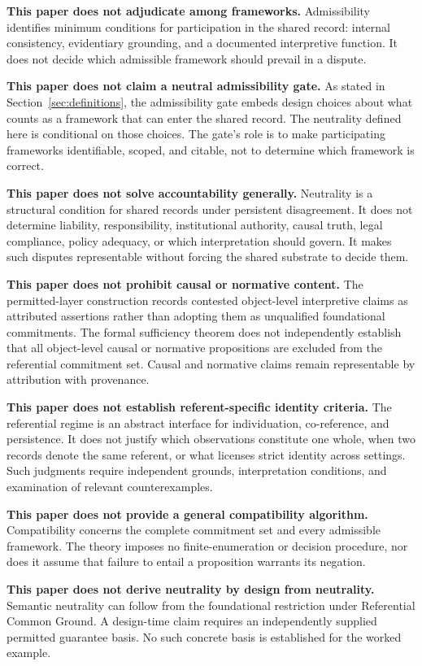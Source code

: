 \documentclass[11pt]{article}
\theoremstyle{plain}
\theoremstyle{definition}
\theoremstyle{remark}
\newcommand{\SecRef}[1]{Section~\ref{#1}}
\begin{document}
\textbf{This paper does not adjudicate among frameworks.}
Admissibility identifies minimum conditions for participation in the shared
record:
internal consistency,
evidentiary grounding,
and a documented interpretive function.
It does not decide which admissible framework should prevail in a dispute.

\textbf{This paper does not claim a neutral admissibility gate.}
As stated in \SecRef{sec:definitions},
the admissibility gate embeds design choices about what counts as
a framework that can enter the shared record.
The neutrality defined here is conditional on those choices.
The gate's role is to make participating frameworks identifiable,
scoped, and citable,
not to determine which framework is correct.

\textbf{This paper does not solve accountability generally.}
Neutrality is a structural condition for
shared records under persistent disagreement.
It does not determine liability, responsibility, institutional authority,
causal truth, legal compliance, policy adequacy, or
which interpretation should govern.
It makes such disputes representable without
forcing the shared substrate to decide them.

\textbf{This paper does not prohibit causal or normative content.}
The permitted-layer construction records contested object-level
interpretive claims as attributed assertions rather than adopting them
as unqualified foundational commitments.
The formal sufficiency theorem does not independently establish that
all object-level causal or normative propositions are excluded from
the referential commitment set.
Causal and normative claims remain representable by attribution with provenance.

\textbf{This paper does not establish referent-specific identity criteria.}
The referential regime is an abstract interface for individuation,
co-reference, and persistence. It does not justify which observations
constitute one whole, when two records denote the same referent,
or what licenses strict identity across settings.
Such judgments require independent grounds, interpretation conditions,
and examination of relevant counterexamples.

\textbf{This paper does not provide a general compatibility algorithm.}
Compatibility concerns the complete commitment set and every admissible
framework. The theory imposes no finite-enumeration or decision procedure,
nor does it assume that failure to entail a proposition warrants
its negation.

\textbf{This paper does not derive neutrality by design from neutrality.}
Semantic neutrality can follow from the foundational restriction under
Referential Common Ground. A design-time claim requires an independently
supplied permitted guarantee basis.
No such concrete basis is established for the worked example.
\end{document}
